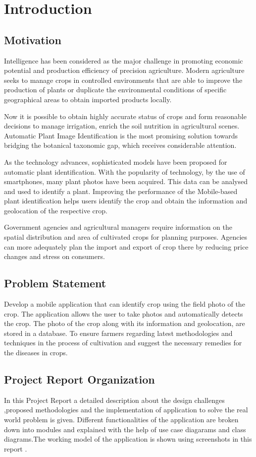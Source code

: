 \documentclass[../Report.tex]{subfiles}
\begin{document}
\chapter{Introduction}

\section{Motivation}
Intelligence has been considered as the major challenge in promoting economic potential and production efficiency of precision
agriculture. Modern agriculture seeks to manage crops in controlled environments that are able to improve the production of plants or
duplicate the environmental conditions of specific geographical areas to obtain imported products locally. \par
Now it is possible to obtain highly accurate status of crops and form reasonable decisions to manage irrigation, enrich the soil
nutrition in agricultural scenes. Automatic Plant Image Identification is the most promising solution towards bridging the botanical
taxonomic gap, which receives considerable attention. \par
As the technology advances, sophisticated models have been proposed for automatic plant identification. With the popularity of technology, 
by the use of smartphones, many plant photos have been acquired. This data can be analysed and used to identify a plant. Improving the 
performance of the Mobile-based plant identification helps users identify the crop and obtain the information and geolocation of the 
respective crop.\par
Government agencies and agricultural managers require information on the spatial distribution and area of cultivated crops for planning 
purposes. Agencies can more adequately plan the import and export of crop there by reducing price changes and stress on consumers.

\section{Problem Statement}
Develop a mobile application that can identify crop using the field photo of the crop. The application allows the user to take photos 
and automatically detects the crop. The photo of the crop along with its information and geolocation, are stored in a database. To ensure 
farmers regarding latest methodologies and techniques in the process of cultivation and suggest the necessary remedies for the 
diseases in crops.\par


\section{Project Report Organization}
   In this Project Report a detailed description about the design challenges ,proposed  methodologies and the implementation
of application to solve the real world problem is given. Different functionalities of the application are broken down into
modules and explained with the help of use case diagarams and class diagrams.The working model of the   application is shown using
screenshots in this report .
\end{document}
